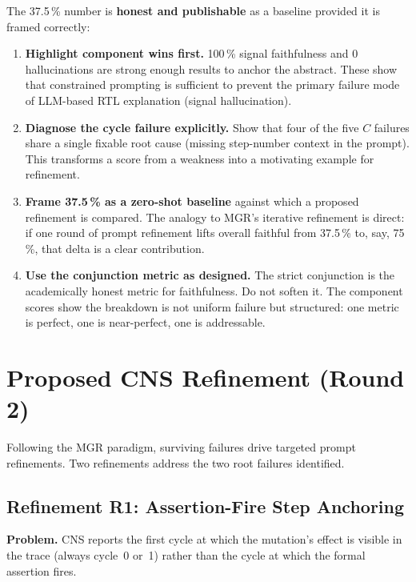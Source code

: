 \documentclass[11pt,a4paper]{article}
\begin{document}
The 37.5\,\% number is \textbf{honest and publishable} as a baseline provided
it is framed correctly:

\begin{enumerate}
  \item \textbf{Highlight component wins first.}  100\,\% signal faithfulness
    and 0 hallucinations are strong enough results to anchor the abstract.
    These show that constrained prompting is sufficient to prevent the primary
    failure mode of LLM-based RTL explanation (signal hallucination).

  \item \textbf{Diagnose the cycle failure explicitly.}  Show that four of the
    five $C$ failures share a single fixable root cause (missing step-number
    context in the prompt). This transforms a score from a weakness into a
    motivating example for refinement.

  \item \textbf{Frame 37.5\,\% as a zero-shot baseline}  against which
    a proposed refinement is compared. The analogy to MGR's iterative
    refinement is direct: if one round of prompt refinement lifts overall
    faithful from 37.5\,\% to, say, 75\,\%, that delta is a clear contribution.

  \item \textbf{Use the conjunction metric as designed.}  The strict
    conjunction is the academically honest metric for faithfulness. Do not soften
    it. The component scores show the breakdown is not uniform failure but
    structured: one metric is perfect, one is near-perfect, one is addressable.
\end{enumerate}

\section{Proposed CNS Refinement (Round 2)}

Following the MGR paradigm, surviving failures drive targeted prompt
refinements. Two refinements address the two root failures identified.

\subsection{Refinement R1: Assertion-Fire Step Anchoring}

\textbf{Problem.} CNS reports the first cycle at which the mutation's effect is
visible in the trace (always cycle~0 or~1) rather than the cycle at which the
formal assertion fires.
\end{document}

